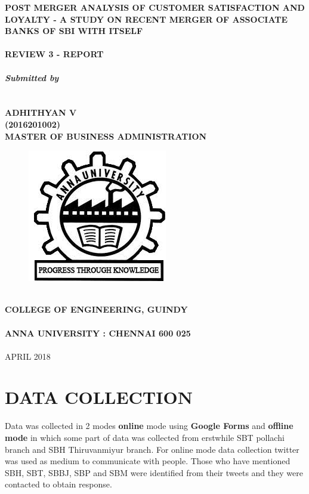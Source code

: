 \documentclass[a4paper, 14pt]{article}
\newcommand\tab[1][1cm]{\hspace*{#1}}
\begin{document}
\selectfont
{
\begin{center}	
\textbf{\fontsize{18}{2} \selectfont POST MERGER ANALYSIS OF CUSTOMER SATISFACTION AND LOYALTY - A STUDY ON RECENT MERGER OF ASSOCIATE BANKS OF SBI WITH ITSELF}\\
\tab \\
\textbf{\fontsize{14}{2} \selectfont REVIEW 3 - REPORT}\\
\tab \\
\textbf{\fontsize{14}{2} \selectfont \emph{Submitted by}}\\
\tab \\
\tab \\
{\fontsize{16}{2} \selectfont
\textbf{ADHITHYAN V}}\\
{\fontsize{16}{2} \selectfont \textbf{(2016201002)}}\\

\textbf{\fontsize{16}{2} \selectfont MASTER OF BUSINESS ADMINISTRATION}\\
\begin{figure}[H]
\centering
\includegraphics[scale=0.5]{anna_univ_logo.jpg}
\end{figure}
\tab \\
\textbf{\fontsize{14}{2} \selectfont COLLEGE OF ENGINEERING, GUINDY}\\
\tab \\
\textbf{\fontsize{16}{2} \selectfont ANNA UNIVERSITY : CHENNAI 600 025}\\
\tab \\
{\fontsize{14}{2} \selectfont APRIL 2018}\\
\end{center}
\newpage
\section*{DATA COLLECTION}
\par Data was collected in 2 modes \textbf{online} mode using \textbf{Google Forms} and \textbf{offline mode} in which some part of data was collected from erstwhile SBT pollachi branch and SBH Thiruvanmiyur branch. For online mode data collection twitter was used as medium to communicate with people. Those who have mentioned SBH, SBT, SBBJ, SBP and SBM were identified from their tweets and they were contacted to obtain response.
}
\end{document}
